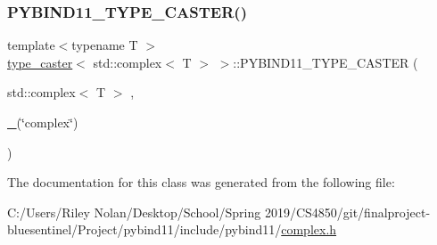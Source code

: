 \subsubsection{\texorpdfstring{PYBIND11\_TYPE\_CASTER()}{PYBIND11\_TYPE\_CASTER()}}
{\footnotesize\ttfamily template$<$typename T $>$ \\
\mbox{\hyperlink{classtype__caster}{type\+\_\+caster}}$<$ std\+::complex$<$ T $>$ $>$\+::P\+Y\+B\+I\+N\+D11\+\_\+\+T\+Y\+P\+E\+\_\+\+C\+A\+S\+T\+ER (\begin{DoxyParamCaption}\item[{std\+::complex$<$ T $>$}]{,  }\item[{\mbox{\hyperlink{descr_8h_af114703e20c6527e87163eb2798f74b8}{\+\_\+}}(\char`\"{}complex\char`\"{})}]{ }\end{DoxyParamCaption})}



The documentation for this class was generated from the following file\+:\begin{DoxyCompactItemize}
\item 
C\+:/\+Users/\+Riley Nolan/\+Desktop/\+School/\+Spring 2019/\+C\+S4850/git/finalproject-\/bluesentinel/\+Project/pybind11/include/pybind11/\mbox{\hyperlink{complex_8h}{complex.\+h}}\end{DoxyCompactItemize}
